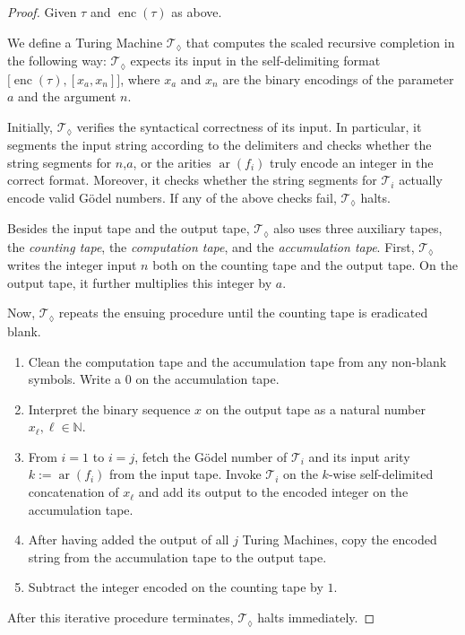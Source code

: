 \begin{proof}
	Given $\tau$ and $\operatorname{enc}(\tau)$ as above.
	
	We define a Turing Machine $\mathcal{T}_{\lozenge}$ that computes the scaled recursive completion in the following way:
	$\mathcal{T}_{\lozenge}$ expects its input in the self-delimiting format $\bigl[\operatorname{enc}(\tau),[x_a,x_n]\bigr]$, where $x_a$ and $x_n$ are the binary encodings of the parameter $a$ and the argument $n$.
	
	Initially, $\mathcal{T}_{\lozenge}$ verifies the syntactical correctness of its input.
	In particular, it segments the input string according to the delimiters and checks whether the string segments for $n$,$a$, or the arities $\operatorname{ar}(f_i)$ truly encode an integer in the correct format.
	Moreover, it checks whether the string segments for $\mathcal{T}_i$ actually encode valid G\"odel numbers.
	If any of the above checks fail, $\mathcal{T}_{\lozenge}$ halts.
	
	Besides the input tape and the output tape, $\mathcal{T}_{\lozenge}$ also uses three auxiliary tapes, the \textit{counting tape}, the \textit{computation tape}, and the \textit{accumulation tape}.
	First, $\mathcal{T}_{\lozenge}$ writes the integer input $n$ both on the counting tape and the output tape.
	On the output tape, it further multiplies this integer by $a$.
	
	Now, $\mathcal{T}_{\lozenge}$ repeats the ensuing procedure until the counting tape is eradicated blank. 
	\begin{enumerate}
		\item Clean the computation tape and the accumulation tape from any non-blank symbols. Write a $0$ on the accumulation tape.
		\item Interpret the binary sequence $x$ on the output tape as a natural number $x_\ell,\ell\in\mathbb{N}$.
		\item From $i=1$ to $i=j$, fetch the G\"odel number of $\mathcal{T}_i$ and its input arity $k:=\operatorname{ar}(f_i)$ from the input tape. Invoke $\mathcal{T}_i$ on the $k$-wise self-delimited concatenation of $x_\ell$ and add its output to the encoded integer on the accumulation tape.
		\item After having added the output of all $j$ Turing Machines, copy the encoded string from the accumulation tape to the output tape.
		\item Subtract the integer encoded on the counting tape by $1$.
	\end{enumerate}
	After this iterative procedure terminates, $\mathcal{T}_{\lozenge}$ halts immediately.
	

\end{proof}
